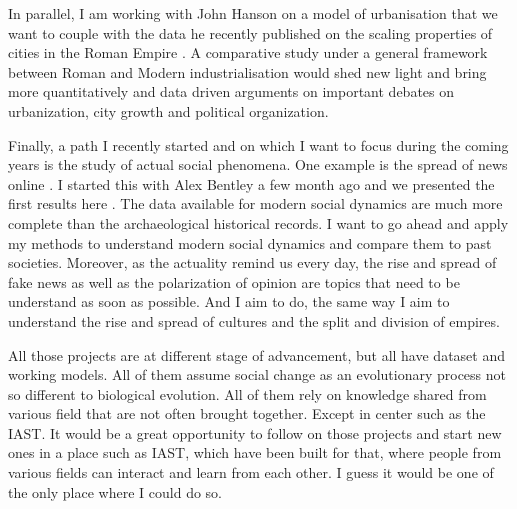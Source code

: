 \documentclass[10pt]{article}
\begin{document}
In parallel, I am working with John Hanson on a model of urbanisation that we want to couple with the data he recently published on the scaling properties of cities in the Roman Empire \cite{Hanson20170367}. A comparative study under a general framework between Roman and Modern industrialisation would shed new light and bring more quantitatively and data driven arguments on important debates on urbanization, city growth and political organization.

Finally, a path I recently started and on which I want to focus during the coming years is the study of actual social phenomena.  One example is the spread of news online \cite{carrignon2018}. I started this with Alex Bentley a few month ago and we presented the first results here \cite{carrignon2018}. The data available for modern social dynamics are much more complete than the archaeological historical records.  I want to go ahead and apply my methods to understand modern social dynamics and compare them to past societies.  Moreover, as the actuality remind us every day, the rise and spread of fake news as well as the polarization of opinion are topics that need to be understand as soon as possible.  And I aim to do, the same way I aim to understand the rise and spread of cultures and the split and division of empires. 

All those projects are at different stage of advancement, but all have dataset and working models. All of them assume social change as an evolutionary process not so different to biological evolution. All of them rely on knowledge shared from various field that are not often brought together. Except in center such as the IAST. It would be a great opportunity to follow on those projects and start new ones in a place such as IAST, which have been built for that,  where people from various fields can interact and learn from each other. I guess it would be one of the only place where I could do so.




                   
\end{document}
